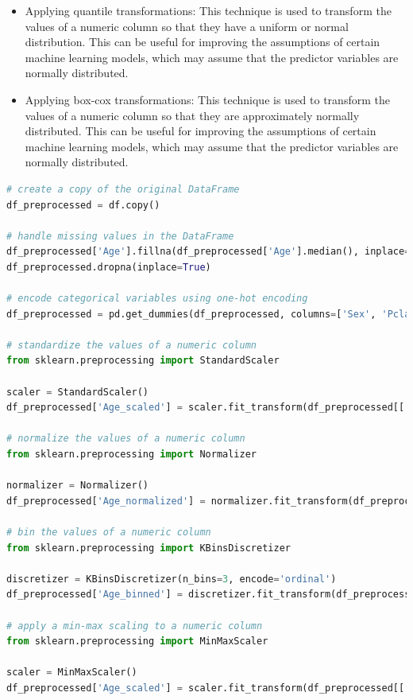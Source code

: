 \documentclass[11pt]{article}
\begin{document}
\begin{itemize}
\item Applying quantile transformations: This technique is used to transform the values of a numeric column so that they have a uniform or normal distribution. This can be useful for improving the assumptions of certain machine learning models, which may assume that the predictor variables are normally distributed.
\item Applying box-cox transformations: This technique is used to transform the values of a numeric column so that they are approximately normally distributed. This can be useful for improving the assumptions of certain machine learning models, which may assume that the predictor variables are normally distributed.
\end{itemize} 


\begin{mdframed}[backgroundcolor=celadon!6]
\begin{lstlisting}[language=Python]
# create a copy of the original DataFrame
df_preprocessed = df.copy()

# handle missing values in the DataFrame
df_preprocessed['Age'].fillna(df_preprocessed['Age'].median(), inplace=True)
df_preprocessed.dropna(inplace=True)

# encode categorical variables using one-hot encoding
df_preprocessed = pd.get_dummies(df_preprocessed, columns=['Sex', 'Pclass'], prefix=['sex', 'pclass'])

# standardize the values of a numeric column
from sklearn.preprocessing import StandardScaler

scaler = StandardScaler()
df_preprocessed['Age_scaled'] = scaler.fit_transform(df_preprocessed[['Age']])

# normalize the values of a numeric column
from sklearn.preprocessing import Normalizer

normalizer = Normalizer()
df_preprocessed['Age_normalized'] = normalizer.fit_transform(df_preprocessed[['Age']])

# bin the values of a numeric column
from sklearn.preprocessing import KBinsDiscretizer

discretizer = KBinsDiscretizer(n_bins=3, encode='ordinal')
df_preprocessed['Age_binned'] = discretizer.fit_transform(df_preprocessed[['Age']])

# apply a min-max scaling to a numeric column
from sklearn.preprocessing import MinMaxScaler

scaler = MinMaxScaler()
df_preprocessed['Age_scaled'] = scaler.fit_transform(df_preprocessed[['Age']])


\end{lstlisting}
\end{mdframed}
\end{document}
